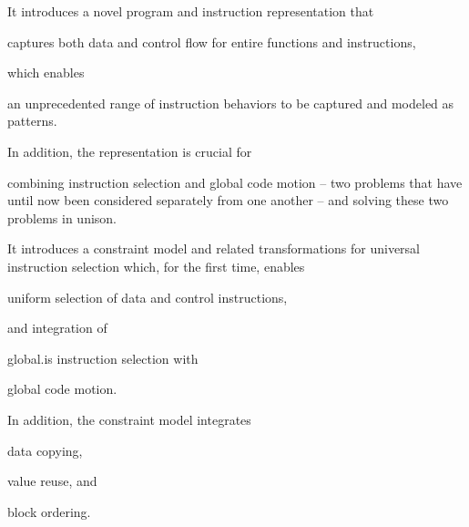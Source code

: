 \begin{contributions}
  \item {}
    It introduces a novel \gls{program} and \gls{instruction} representation
    that
    \begin{contributions}
      \item {}
        captures both data and control flow for entire \glspl{function} and
        \glspl{instruction},
    \end{contributions}
    which enables
    \begin{contributions}[resume]
      \item {}
        an unprecedented range of instruction behaviors to be captured and
        modeled as \glspl{pattern}.
    \end{contributions}
    In addition, the representation is crucial for
    \begin{contributions}[resume]
      \item {}
        combining \gls{instruction selection} and \gls{global code motion} --
        two problems that have until now been considered separately from one
        another -- and solving these two problems in unison.
    \end{contributions}

  \item {}
    It introduces a \gls{constraint model} and related transformations for
    \gls{universal instruction selection} which, for the first time, enables
    \begin{contributions}
      \item {}
        uniform selection of data and control \glspl{instruction},
    \end{contributions}
    and integration of
    \begin{contributions}[resume]
      \item {}
        \gls{global.is} \gls{instruction selection} with
      \item {}
        \gls{global code motion}.
    \end{contributions}
    In addition, the \gls{constraint model} integrates
    \begin{contributions}[resume]
      \item {}
        \gls{data copying},
      \item {}
        \gls{value reuse}, and
      \item {}
        \gls{block ordering}.
    \end{contributions}


\end{contributions}
